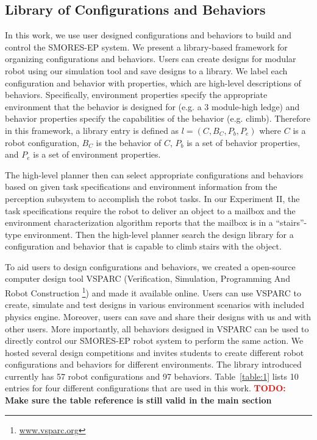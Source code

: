 \documentclass[12pt]{article}
\newcommand{\TODO}[1]{ {\bf \textcolor{red}{TODO:} #1 }}
\begin{document}
%



\subsection{Library of Configurations and Behaviors}
\label{sec:configuration-specifics}

In this work, we use user designed configurations and behaviors to build and control the SMORES-EP system.
We present a library-based framework for organizing configurations and behaviors.
Users can create designs for modular robot using our simulation tool and save designs to a library.
We label each configuration and behavior with properties, which are high-level descriptions of behaviors.
Specifically, environment properties specify the appropriate environment that the behavior is designed for (e.g. a 3 module-high ledge) and behavior properties specify the capabilities of the behavior (e.g. climb). 
Therefore in this framework, a library entry is defined as $l = (C,B_C,P_b,P_e)$ where $C$ is a robot configuration, $B_C$ is the behavior of $C$, $P_b$ is a set of behavior properties, and $P_e$ is a set of environment properties.

The high-level planner then can select appropriate configurations and behaviors based on given task specifications and environment information from the perception subsystem to accomplish the robot tasks.
In our Experiment II, the task specifications require the robot to deliver an object to a mailbox and the environment characterization algorithm reports that the mailbox is in a ``stairs''-type environment.
Then the high-level planner search the design library for a configuration and behavior that is capable to climb stairs with the object.

To aid users to design configurations and behaviors, we created a open-source computer design tool VSPARC (Verification, Simulation, Programming And Robot Construction \footnote{\url{www.vsparc.org}}) and made it available online.
Users can use VSPARC to create, simulate and test designs in various environment scenarios with included physics engine.
Moreover, users can save and share their designs with us and with other users.
More importantly, all behaviors designed in VSPARC can be used to directly control our SMORES-EP robot system to perform the same action.
We hosted several design competitions and invites students to create different robot configurations and behaviors for different environments.
The library introduced currently has 57 robot configurations and 97 behaviors.
Table~\ref{table:1} lists 10 entries for four different configurations that are used in this work. \TODO{Make sure the table reference is still valid in the main section}
\end{document}
